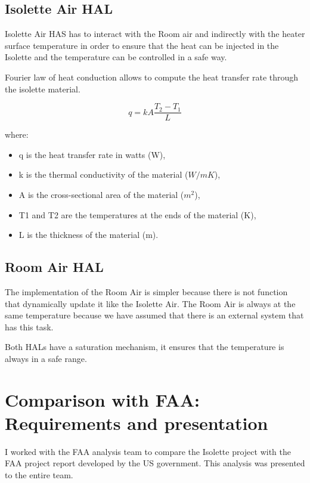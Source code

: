 \documentclass[a4paper, 12pt]{article}
\begin{document}
\subsection{Isolette Air HAL}

Isolette Air HAS has to interact with the Room air and indirectly with the heater surface temperature in order to ensure
that the heat can be injected in the Isolette and the temperature can be controlled in a safe way.

Fourier law of heat conduction allows to compute the heat transfer rate through the isolette material.

\begin{equation}
q = k A \frac{T_2 - T_1}{L}
\end{equation}

where:
\begin{itemize}
    \item q is the heat transfer rate in watts (W),
    \item k is the thermal conductivity of the material (\( W/mK \)),
    \item A is the cross-sectional area of the material (\( m^2 \)),
    \item T1 and T2 are the temperatures at the ends of the material (K),
    \item L is the thickness of the material (m).
\end{itemize}

\subsection{Room Air HAL}

The implementation of the Room Air is simpler because there is not function that dynamically update it like the Isolette Air.
The Room Air is always at the same temperature because we have assumed that there is an external system that has this task.

Both HALs have a saturation mechanism, it ensures that the temperature is always in a safe range.

\section{Comparison with FAA: Requirements and presentation}

I worked with the FAA analysis team to compare the Isolette project with the FAA project report developed by the US government. This analysis was presented to the entire team.
\end{document}
